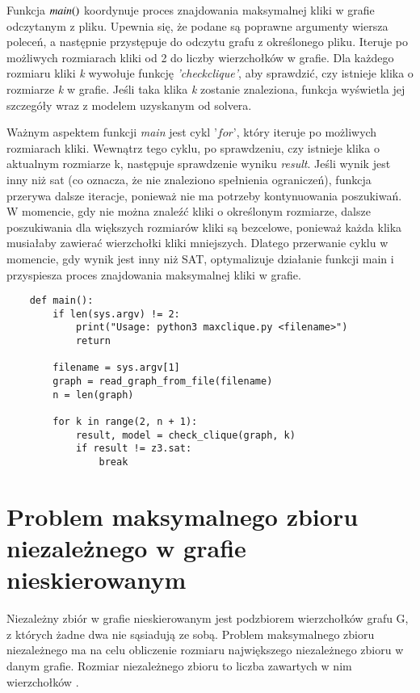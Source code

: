 

Funkcja ${\mathit{main()}}$ koordynuje proces znajdowania maksymalnej kliki w grafie odczytanym z pliku. Upewnia się, że podane są poprawne argumenty wiersza poleceń, a następnie przystępuje do odczytu grafu z określonego pliku. Iteruje po możliwych rozmiarach kliki od 2 do liczby wierzchołków w grafie. Dla każdego rozmiaru kliki \textit{k} wywołuje funkcję \textit{'check\textunderscore clique'}, aby sprawdzić, czy istnieje klika o rozmiarze \textit{k} w grafie. Jeśli taka klika \textit{k} zostanie znaleziona, funkcja wyświetla jej szczegóły wraz z modelem uzyskanym od solvera. 

Ważnym aspektem funkcji \textit{main} jest cykl $\textit{'for'}$, który iteruje po możliwych rozmiarach kliki. Wewnątrz tego cyklu, po sprawdzeniu, czy istnieje klika o aktualnym rozmiarze k, następuje sprawdzenie wyniku \textit{result}. Jeśli wynik jest inny niż sat (co oznacza, że nie znaleziono spełnienia ograniczeń), funkcja przerywa dalsze iteracje, ponieważ nie ma potrzeby kontynuowania poszukiwań. W momencie, gdy nie można znaleźć kliki o określonym rozmiarze, dalsze poszukiwania dla większych rozmiarów kliki są bezcelowe, ponieważ każda klika musiałaby zawierać wierzchołki kliki mniejszych. Dlatego przerwanie cyklu w momencie, gdy wynik jest inny niż SAT, optymalizuje działanie funkcji main i przyspiesza proces znajdowania maksymalnej kliki w grafie.

\begin{lstlisting}
	def main():
		if len(sys.argv) != 2:
			print("Usage: python3 maxclique.py <filename>")
			return
		
		filename = sys.argv[1]
		graph = read_graph_from_file(filename)
		n = len(graph)
		
		for k in range(2, n + 1):
			result, model = check_clique(graph, k)
			if result != z3.sat:
				break
\end{lstlisting}


\section{Problem maksymalnego zbioru niezależnego w grafie nieskierowanym}
Niezależny zbiór w grafie nieskierowanym jest podzbiorem wierzchołków grafu G, z których żadne dwa nie sąsiadują ze sobą. Problem maksymalnego zbioru niezależnego ma na celu obliczenie rozmiaru największego niezależnego zbioru w danym grafie. Rozmiar niezależnego zbioru to liczba zawartych w nim wierzchołków \cite{Korshunov1974}.

